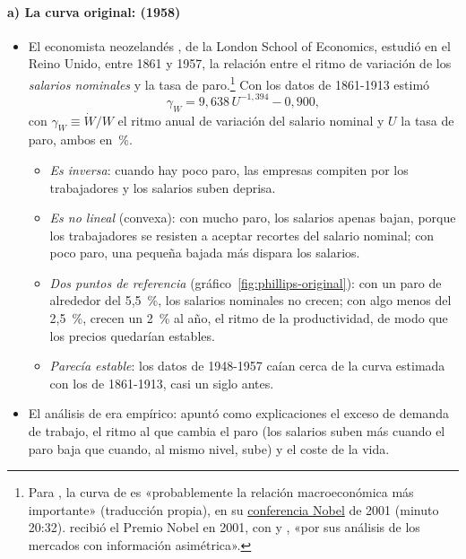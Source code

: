\documentclass[11pt]{article}
\begin{document}
\paragraph{a) La curva original:  (1958)}

\begin{itemize}
\item El economista neozelandés , de la London School of Economics, estudió en el Reino Unido, entre 1861 y 1957, la relación entre el ritmo de variación de los \emph{salarios nominales} y la tasa de paro.\footnote{Para , la curva de  es «probablemente la relación macroeconómica más importante» (traducción propia), en su \href{https://www.nobelprize.org/prizes/economic-sciences/2001/akerlof/lecture/}{conferencia Nobel} de 2001 (minuto 20:32)\nocite{Akerlof2002Behavioral}.  recibió el Premio Nobel en 2001, con  y , «por sus análisis de los mercados con información asimétrica»\nocite{Nobel2001AkerlofSpenceStiglitz}.} Con los datos de 1861-1913 estimó\nocite{Phillips1958}
  \begin{equation}
  \gamma_W=9{,}638\,U^{-1{,}394}-0{,}900, \label{eq:phillips-original}
  \end{equation}
  con $\gamma_W\equiv\dot W/W$ el ritmo anual de variación del salario nominal y $U$ la tasa de paro, ambos en~\%.
  \begin{itemize}
  \item \emph{Es inversa}: cuando hay poco paro, las empresas compiten por los trabajadores y los salarios suben deprisa.
  \item \emph{Es no lineal} (convexa): con mucho paro, los salarios apenas bajan, porque los trabajadores se resisten a aceptar recortes del salario nominal; con poco paro, una pequeña bajada más dispara los salarios.
  \item \emph{Dos puntos de referencia} (gráfico~\ref{fig:phillips-original}): con un paro de alrededor del 5,5~\%, los salarios nominales no crecen; con algo menos del 2,5~\%, crecen un 2~\% al año, el ritmo de la productividad, de modo que los precios quedarían estables.
  \item \emph{Parecía estable}: los datos de 1948-1957 caían cerca de la curva estimada con los de 1861-1913, casi un siglo antes.
  \end{itemize}
\item El análisis de  era empírico: apuntó como explicaciones el exceso de demanda de trabajo, el ritmo al que cambia el paro (los salarios suben más cuando el paro baja que cuando, al mismo nivel, sube) y el coste de la vida.
\end{itemize}
\end{document}
